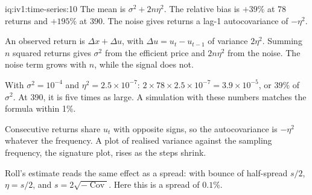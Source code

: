 \begin{solution}{iq:iv1:time-series:10}
The mean is $\sigma^2 + 2n\eta^2$. The relative bias is $+39\%$ at 78 returns and $+195\%$ at 390. The noise gives returns a lag-1 autocovariance of $-\eta^2$.

An observed return is $\Delta x + \Delta u$, with $\Delta u = u_t - u_{t - 1}$ of variance $2\eta^2$. Summing $n$ squared returns gives $\sigma^2$ from the efficient price and $2n\eta^2$ from the noise. The noise term grows with $n$, while the signal does not.

With $\sigma^2 = 10^{-4}$ and $\eta^2 = 2.5 \times 10^{-7}$: $2 \times 78 \times 2.5 \times 10^{-7} = 3.9 \times 10^{-5}$, or $39\%$ of $\sigma^2$. At 390, it is five times as large. A simulation with these numbers matches the formula within 1\%.

Consecutive returns share $u_t$ with opposite signs, so the autocovariance is $-\eta^2$ whatever the frequency. A plot of realised variance against the sampling frequency, the signature plot, rises as the steps shrink.

Roll's estimate reads the same effect as a spread: with bounce of half-spread $s/2$, $\eta = s/2$, and $s = 2\sqrt{-\operatorname{Cov}}$. Here this is a spread of $0.1\%$.



\end{solution}

